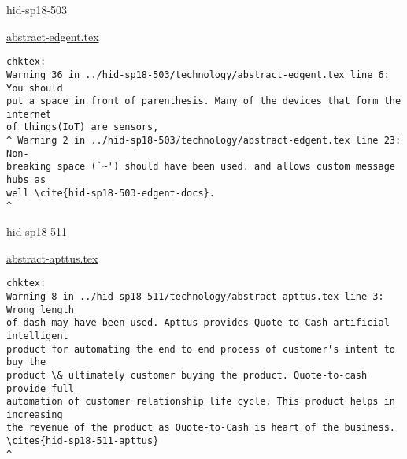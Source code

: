 

\begin{IU}

hid-sp18-503

\href{https://github.com/cloudmesh-community/hid-sp18-503/blob/master//technology/abstract-edgent.tex}{abstract-edgent.tex}

\begin{tiny}
\begin{verbatim}
chktex:
Warning 36 in ../hid-sp18-503/technology/abstract-edgent.tex line 6: You should
put a space in front of parenthesis. Many of the devices that form the internet
of things(IoT) are sensors,
^ Warning 2 in ../hid-sp18-503/technology/abstract-edgent.tex line 23: Non-
breaking space (`~') should have been used. and allows custom message hubs as
well \cite{hid-sp18-503-edgent-docs}.                                         ^
\end{verbatim}
\end{tiny}
\end{IU}



\begin{IU}

hid-sp18-511

\href{https://github.com/cloudmesh-community/hid-sp18-511/blob/master//technology/abstract-apttus.tex}{abstract-apttus.tex}

\begin{tiny}
\begin{verbatim}
chktex:
Warning 8 in ../hid-sp18-511/technology/abstract-apttus.tex line 3: Wrong length
of dash may have been used. Apttus provides Quote-to-Cash artificial intelligent
product for automating the end to end process of customer's intent to buy the
product \& ultimately customer buying the product. Quote-to-cash provide full
automation of customer relationship life cycle. This product helps in increasing
the revenue of the product as Quote-to-Cash is heart of the business.
\cites{hid-sp18-511-apttus}
^
\end{verbatim}
\end{tiny}
\end{IU}



